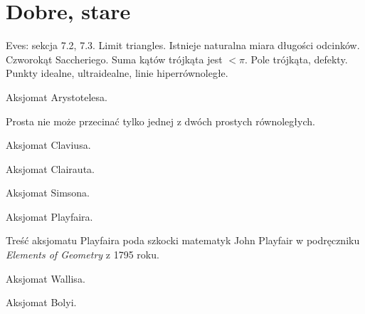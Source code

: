 \section{Dobre, stare} %

Eves: sekcja 7.2, 7.3. %
Limit triangles. %
Istnieje naturalna miara długości odcinków. %
Czworokąt Saccheriego. %
Suma kątów trójkąta jest $< \pi$. %
Pole trójkąta, defekty. %
Punkty idealne, ultraidealne, linie hiperrównoległe. %

\begin{proposition}
	Aksjomat Arystotelesa. %
%
\end{proposition}

\begin{proposition}
	Prosta nie może przecinać tylko jednej z dwóch prostych równoległych. %
%
\end{proposition}

\begin{proposition}
	Aksjomat Claviusa. %
%
\end{proposition}

\begin{proposition}
	Aksjomat Clairauta. %
%
\end{proposition}

\begin{proposition}
	Aksjomat Simsona. %
%
\end{proposition}

\begin{proposition}
	Aksjomat Playfaira. %
%
\end{proposition}

Treść aksjomatu Playfaira poda szkocki matematyk John Playfair w podręczniku \emph{Elements of Geometry} z 1795 roku. %
%

\begin{proposition}
	Aksjomat Wallisa. %
%
\end{proposition}

\begin{proposition}
	Aksjomat Bolyi. %
%
\end{proposition}

